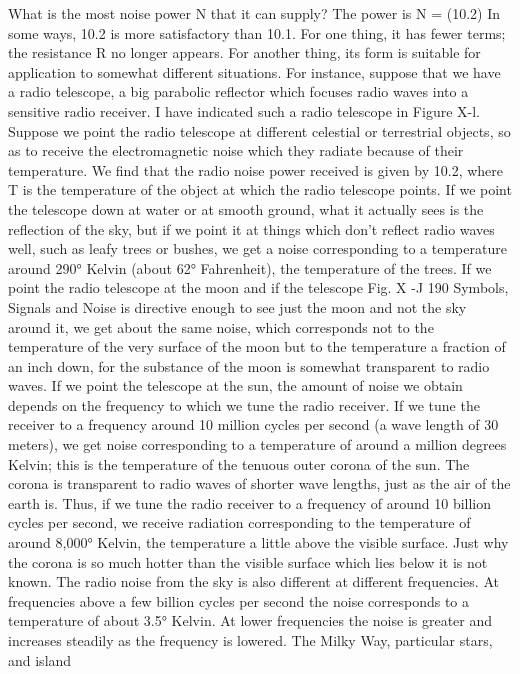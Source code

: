 {{{{{{{{{{{What is the most noise power N that it can supply? The power is
N = \tTW (10.2)
In some ways, 10.2 is more satisfactory than 10.1. For one thing,
it has fewer terms; the resistance R no longer appears. For another
thing, its form is suitable for application to somewhat different
situations.
For instance, suppose that we have a radio telescope, a big
parabolic reflector which focuses radio waves into a sensitive radio
receiver. I have indicated such a radio telescope in Figure X-l.
Suppose we point the radio telescope at different celestial or terrestrial
objects, so as to receive the electromagnetic noise which
they radiate because of their temperature.
We find that the radio noise power received is given by 10.2,
where T is the temperature of the object at which the radio
telescope points.
If we point the telescope down at water or at smooth ground,
what it actually sees is the reflection of the sky, but if we point it
at things which don’t reflect radio waves well, such as leafy trees
or bushes, we get a noise corresponding to a temperature around
290° Kelvin (about 62° Fahrenheit), the temperature of the trees.
If we point the radio telescope at the moon and if the telescope
Fig. X -J
190
Symbols, Signals and Noise
is directive enough to see just the moon and not the sky around
it, we get about the same noise, which corresponds not to the
temperature of the very surface of the moon but to the temperature
a fraction of an inch down, for the substance of the moon is somewhat
transparent to radio waves.
If we point the telescope at the sun, the amount of noise we
obtain depends on the frequency to which we tune the radio
receiver. If we tune the receiver to a frequency around 10 million
cycles per second (a wave length of 30 meters), we get noise
corresponding to a temperature of around a million degrees Kelvin;
this is the temperature of the tenuous outer corona of the sun. The
corona is transparent to radio waves of shorter wave lengths, just
as the air of the earth is. Thus, if we tune the radio receiver to a
frequency of around 10 billion cycles per second, we receive radiation
corresponding to the temperature of around 8,000° Kelvin,
the temperature a little above the visible surface. Just why the
corona is so much hotter than the visible surface which lies below
it is not known.
The radio noise from the sky is also different at different frequencies.
At frequencies above a few billion cycles per second the
noise corresponds to a temperature of about 3.5° Kelvin. At lower
frequencies the noise is greater and increases steadily as the frequency
is lowered. The Milky Way, particular stars, and island
}}}}}}}}}}}
